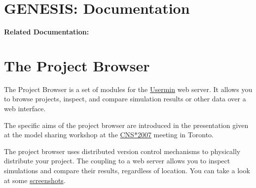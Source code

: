 \documentclass[12pt]{article}
\begin{document}
\section*{GENESIS: Documentation}

{\bf Related Documentation:}

\section*{The Project Browser}

The Project Browser is a set of modules for the \href{http://www.webmin.com/usermin.html}{Usermin} web server. It allows you to browse projects, inspect, and compare simulation results or other data over a web interface.

The specific aims of the project browser are introduced in the presentation given at the model sharing workshop at the \href{../CNS07/CNS07.pdf}{CNS*2007} meeting in Toronto.

The project browser uses distributed version control mechanisms to physically distribute your project. The coupling to a web server allows you to inspect simulations and compare their results, regardless of location. You can take a look at some \href{../project-browser-screenshots/project-browser-screenshots.tex}{screenshots}. 
\end{document}
